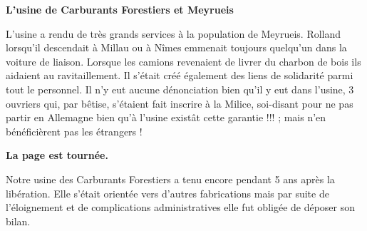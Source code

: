 \vspace{0.55cm}

\textbf{L’usine de Carburants Forestiers et Meyrueis}

\vspace{0.35cm}

L’usine a rendu de très grands services à la population de Meyrueis. Rolland lorsqu’il
descendait à Millau ou à Nîmes emmenait toujours quelqu’un dans la voiture de liaison.
Lorsque les camions revenaient de livrer du charbon de bois ils aidaient au ravitaillement. Il
s’était créé également des liens de solidarité parmi tout le personnel. Il n’y eut aucune
dénonciation bien qu’il y eut dans l’usine, 3 ouvriers qui, par bêtise, s’étaient fait inscrire à la
Milice, soi-disant pour ne pas partir en Allemagne bien qu’à l’usine existât cette garantie !!! ;
mais n’en bénéficièrent pas les étrangers !

\vspace{0.55cm}

\textbf{La page est tournée.}

\vspace{0.35cm}

Notre usine des Carburants Forestiers a tenu encore pendant 5 ans après la libération. Elle
s’était orientée vers d’autres fabrications mais par suite de l’éloignement et de complications
administratives elle fut obligée de déposer son bilan.
